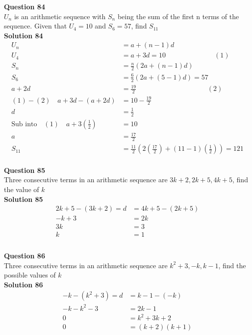\documentclass{article}
\begin{document}
\noindent\textbf{Question 84}\\[5pt]
$U_n$ is an arithmetic sequence with $S_n$ being the sum of the first n terms of the sequence. Given that $U_{4}=10$ and $S_{6}=57$, find $S_{11}$\\[5pt]
\noindent\textbf{Solution 84}\\[5pt]
\begin{align*}
U_n&=a+(n-1)d\\[2pt]
U_4&=a+3d=10 \hspace{85pt} (1)\\[2pt]
S_n&=\displaystyle\frac{n}{2}(2a+(n-1)d)\\[2pt]
S_6&=\displaystyle\frac{6}{2}(2a+(5-1)d)=57\\[2pt]
a+2d&=\displaystyle\frac{19}{2}\hspace{124pt}(2)\\[2pt]
(1)-(2) \quad a+3d-(a+2d)&=10-\displaystyle\frac{19}{2}\\[2pt]
d&=\displaystyle\frac{1}{2}\\[2pt]
\text{Sub into}\quad (1) \quad a+3\left(\displaystyle\frac{1}{2}\right)&=10\\[2pt]
a&=\displaystyle\frac{17}{2}\\[12pt]
S_{11}&=\displaystyle\frac{11}{2}\left(2\left(\displaystyle\frac{17}{2}\right)+(11-1)\left(\displaystyle\frac{1}{2}\right)\right)=121
\end{align*}\\[10pt]

\noindent\textbf{Question 85}\\[5pt]
Three consecutive terms in an arithmetic sequence are $3k+2,2k+5,4k+5$, find the value of $k$\\[5pt]
\noindent\textbf{Solution 85}\\[5pt]
\begin{align*}
2k+5-(3k+2)=d&=4k+5-(2k+5)\\[2pt]
-k+3&=2k\\[2pt]
3k&=3\\[2pt]
k&=1\\[-70pt]
\end{align*}\\[10pt]

\noindent\textbf{Question 86}\\[5pt]
Three consecutive terms in an arithmetic sequence are $k^2+3,-k,k-1$, find the possible values of $k$\\[5pt]
\noindent\textbf{Solution 86}\\[5pt]
\begin{align*}
-k-(k^2+3)=d&=k-1-(-k)\\[2pt]
-k-k^2-3&=2k-1\\[2pt]
0&=k^2+3k+2\\[2pt]
0&=(k+2)(k+1)\\[-70pt]
\end{align*}\\[10pt]
\end{document}
